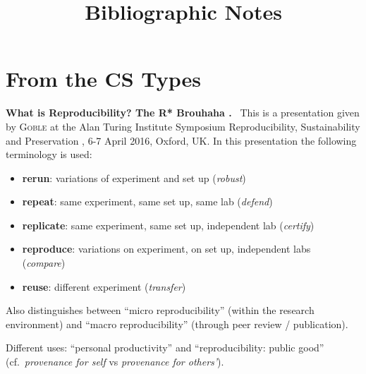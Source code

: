 \documentclass[sigconf,screen,nonacm]{acmart}
\newcommand{\mypara}[1]{\vspace{6pt}\noindent\textbf{#1}~}
\begin{document}
\title{Bibliographic Notes}

 

\maketitle




\tableofcontents

\section{From the CS Types}

\mypara{What is Reproducibility? The R* Brouhaha
  \cite{carolegoble2016what}.} This is a presentation given by \textsc{Goble}
at the Alan Turing Institute Symposium Reproducibility, Sustainability
and Preservation , 6-7 April 2016, Oxford, UK. In this presentation
the following terminology is used:
  \begin{itemize}
  \item \textbf{rerun}: variations of experiment and set up \hfill (\emph{robust})
  \item \textbf{repeat}: same experiment, same set up, same lab \hfill (\emph{defend})
  \item \textbf{replicate}: same experiment, same set up, independent lab
    \hfill (\emph{certify})
  \item \textbf{reproduce}: variations on experiment, on set up, independent
    labs \mbox{~~~~} \hfill  (\emph{compare})
  \item \textbf{reuse}: different experiment \hfill (\emph{transfer})
  \end{itemize}
Also distinguishes between ``micro reproducibility'' (within the
research environment) and ``macro reproducibility'' (through peer
review / publication). 

Different uses: ``personal productivity'' and ``reproducibility:
public good'' (cf.\ \emph{provenance for self} vs \emph{provenance for
  others'}). 
\end{document}
